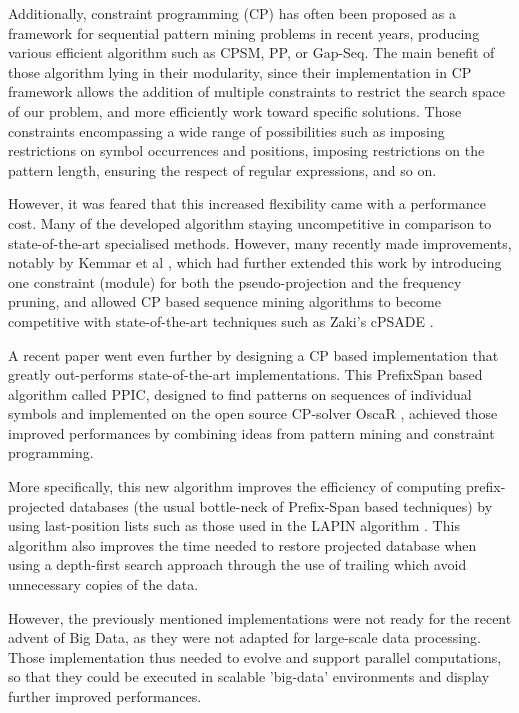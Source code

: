 \documentclass{eplmastersthesis}
\begin{document}
Additionally, constraint programming (CP) has often been proposed as a framework for sequential pattern mining problems in recent years, producing various efficient algorithm such as CPSM, PP, or Gap-Seq. The main benefit of those algorithm lying in their modularity, since their implementation in CP framework allows the addition of multiple constraints to restrict the search space of our problem, and more efficiently work toward specific solutions. Those constraints encompassing a wide range of possibilities such as imposing restrictions on symbol occurrences and positions, imposing restrictions on the pattern length, ensuring the respect of regular expressions, and so on. \newline

However, it was feared that this increased flexibility came with a performance cost. Many of the developed algorithm staying uncompetitive in comparison to state-of-the-art specialised methods.
However, many recently made improvements, notably by Kemmar et al \cite{Kemmar_global, Kemmar_gap}, which had further extended this work by introducing one constraint (module) for both the pseudo-projection and the frequency pruning, and allowed CP based sequence mining algorithms to become competitive with state-of-the-art techniques such as Zaki's cPSADE \cite{zaki2001spade}. \newline

A recent paper \cite{aoga2016efficient} went even further by designing a CP based implementation that greatly out-performs state-of-the-art implementations. This PrefixSpan based algorithm called PPIC, designed to find patterns on sequences of individual symbols and implemented on the open source CP-solver OscaR \cite{oscar}, achieved those improved performances by combining ideas from pattern
mining and constraint programming. \newline

More specifically, this new algorithm improves the efficiency of computing prefix-projected databases (the usual bottle-neck of Prefix-Span based techniques) by using last-position lists such as those used in the LAPIN algorithm \cite{yang2007lapin}. This algorithm also improves the time needed to restore projected database when using a depth-first search approach through the use of trailing which avoid unnecessary copies of the data. \newline

However, the previously mentioned implementations were not ready for the recent advent of Big Data, as they were not adapted for large-scale data processing. Those implementation thus needed to evolve and support parallel computations, so that they could be executed in scalable 'big-data' environments and display further improved performances. \newline
\end{document}
